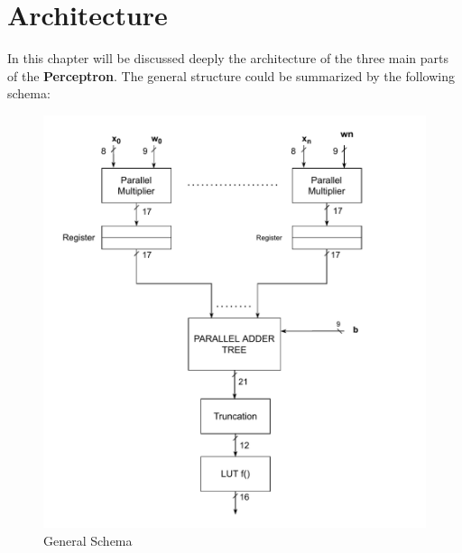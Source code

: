 \section{Architecture}

In this chapter will be discussed deeply the architecture of the three main parts of the \textbf{Perceptron}. The general structure could be summarized by the following schema:
\begin{figure}[H]
	\centering
	\includegraphics[width=12cm]{img/architecture_general_schema.pdf}
	\caption{General Schema}
\end{figure}

